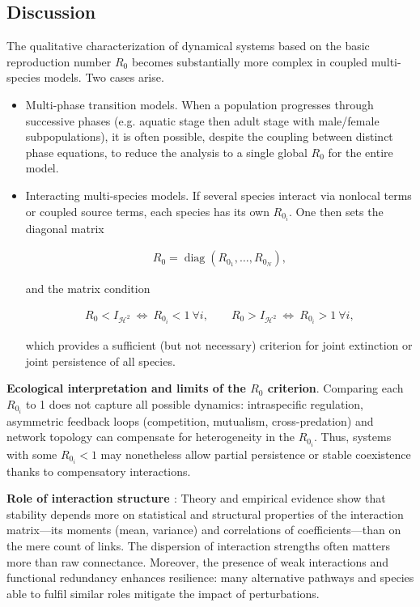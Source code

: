 \documentclass[10pt, a4paper]{amsart}
\theoremstyle{plain}
\theoremstyle{definition}
\theoremstyle{remark}
\numberwithin{equation}{section}
\begin{document}
\subsection*{\bf Discussion}
The qualitative characterization of dynamical systems based on the basic reproduction number $R_0$ becomes substantially more complex in coupled multi-species models. Two cases arise.
\begin{itemize}
\item  Multi-phase transition models. When a population progresses through successive phases (e.g. aquatic stage then adult stage with male/female subpopulations), it is often possible, despite the coupling between distinct phase equations, to reduce the analysis to a single global $R_0$ for the entire model.

\item  Interacting multi-species models. If several species interact via nonlocal terms or coupled source terms, each species has its own $R_{0_i}$. One then sets the diagonal matrix

\begin{align}
R_{0}=\operatorname{diag}(R_{0_1},\dots,R_{0_N}),
\end{align}

and the matrix condition

\begin{align}\label{e2.54}
R_{0}<I_{\mathcal{H}^2} \ \Longleftrightarrow\ R_{0_i}<1\ \forall i,\qquad
R_{0}>I_{\mathcal{H}^2} \ \Longleftrightarrow\ R_{0_i}>1\ \forall i,
\end{align}

which provides a sufficient (but not necessary) criterion for joint extinction or joint persistence of all species.
\end{itemize}
{\bf Ecological interpretation and limits of the $R_0$ criterion}. Comparing each $R_{0_i}$ to 1 does not capture all possible dynamics: intraspecific regulation, asymmetric feedback loops (competition, mutualism, cross-predation) and network topology can compensate for heterogeneity in the $R_{0_i}$. Thus, systems with some $R_{0_i}<1$ may nonetheless allow partial persistence or stable coexistence thanks to compensatory interactions.

{\bf Role of interaction structure \cite{ref75}} : Theory and empirical evidence show that stability depends more on statistical and structural properties of the interaction matrix—its moments (mean, variance) and correlations of coefficients—than on the mere count of links. The dispersion of interaction strengths often matters more than raw connectance. Moreover, the presence of weak interactions and functional redundancy enhances resilience: many alternative pathways and species able to fulfil similar roles mitigate the impact of perturbations.
\end{document}
